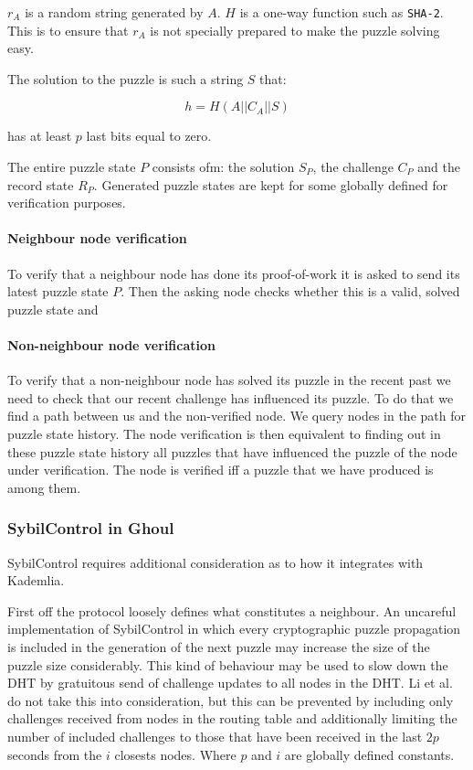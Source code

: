   $r_A$ is a random string generated by $A$. $H$ is a one-way function such as
  \texttt{SHA-2}. This is to ensure that $r_A$ is not specially prepared to make
  the puzzle solving easy.

  The solution to the puzzle is such a string $S$ that:

  \[ h = H\left(A||C_A||S\right)\]

  has at least $p$ last bits equal to zero.

  The entire puzzle state $P$ consists ofm: the solution $S_P$, the challenge
  $C_P$ and the record state $R_P$. Generated puzzle states are kept for some
  globally defined for verification purposes.

  \paragraph{Neighbour node verification}
  To verify that a neighbour node has done its proof-of-work it is asked to send
  its latest puzzle state $P$. Then the asking node checks whether this is a
  valid, solved puzzle state and 

  \paragraph{Non-neighbour node verification}
  To verify that a non-neighbour node has solved its puzzle in the recent past we
  need to check that our recent challenge has influenced its puzzle. To do that
  we find a path between us and the non-verified node. We query nodes in the
  path for puzzle state history. The node verification is then equivalent to
  finding out in these puzzle state history all puzzles that have influenced the
  puzzle of the node under verification. The node is verified iff a puzzle that
  we have produced is among them.

\subsubsection{SybilControl in Ghoul}
  SybilControl requires additional consideration as to how it integrates with
  Kademlia.

  First off the protocol loosely defines what constitutes a neighbour. An
  uncareful implementation of SybilControl in which every cryptographic puzzle
  propagation is included in the generation of the next puzzle may increase the
  size of the puzzle size considerably. This kind of behaviour may be used to
  slow down the DHT by gratuitous send of challenge updates to all nodes in the
  DHT. Li et al. do not take this into consideration, but this can be prevented
  by including only challenges received from nodes in the routing table and
  additionally limiting the number of included challenges to those that have
  been received in the last $2p$ seconds from the $i$ closests nodes. Where $p$
  and $i$ are globally defined constants.

